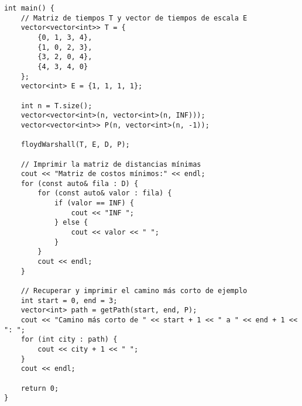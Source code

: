 \documentclass{article}
\begin{document}
\begin{lstlisting}
int main() {
    // Matriz de tiempos T y vector de tiempos de escala E
    vector<vector<int>> T = {
        {0, 1, 3, 4},
        {1, 0, 2, 3},
        {3, 2, 0, 4},
        {4, 3, 4, 0}
    };
    vector<int> E = {1, 1, 1, 1};

    int n = T.size();
    vector<vector<int>(n, vector<int>(n, INF)));
    vector<vector<int>> P(n, vector<int>(n, -1));

    floydWarshall(T, E, D, P);

    // Imprimir la matriz de distancias mínimas
    cout << "Matriz de costos mínimos:" << endl;
    for (const auto& fila : D) {
        for (const auto& valor : fila) {
            if (valor == INF) {
                cout << "INF ";
            } else {
                cout << valor << " ";
            }
        }
        cout << endl;
    }

    // Recuperar y imprimir el camino más corto de ejemplo
    int start = 0, end = 3;
    vector<int> path = getPath(start, end, P);
    cout << "Camino más corto de " << start + 1 << " a " << end + 1 << ": ";
    for (int city : path) {
        cout << city + 1 << " ";
    }
    cout << endl;

    return 0;
}
\end{lstlisting}
\end{document}
